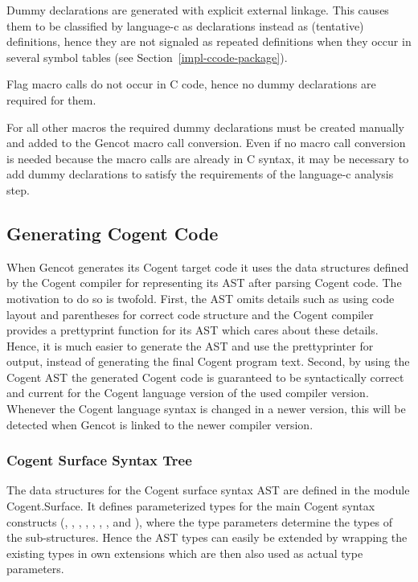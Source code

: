 Dummy declarations are generated with explicit external linkage. This causes them to be classified by language-c as 
declarations instead as (tentative) definitions, hence they are not signaled as repeated definitions when they occur 
in several symbol tables (see Section~\ref{impl-ccode-package}).

Flag macro calls do not occur in C code, hence no dummy declarations are required for them.

For all other macros the required dummy declarations must be created manually and added to the Gencot macro call conversion.
Even if no macro call conversion is needed because the macro calls are already in C syntax, it may be necessary to
add dummy declarations to satisfy the requirements of the language-c analysis step.

\subsection{Generating Cogent Code}
\label{impl-ccode-gencog}

When Gencot generates its Cogent target code it uses the data structures defined by the Cogent compiler for representing
its AST after parsing Cogent code. The motivation to do so is twofold. First, the AST omits details such as using code layout
and parentheses for correct code structure and the Cogent compiler provides a prettyprint function for its AST which cares
about these details. Hence, it is much easier to generate the AST and use the prettyprinter for output, instead of generating
the final Cogent program text. Second, by using the Cogent AST the generated Cogent code is guaranteed to be syntactically correct and
current for the Cogent language version of the used compiler version. Whenever the Cogent language syntax is changed
in a newer version, this will be detected when Gencot is linked to the newer compiler version.

\subsubsection{Cogent Surface Syntax Tree}

The data structures for the Cogent surface syntax AST are defined in the module Cogent.Surface. It defines parameterized types
for the main Cogent syntax constructs (, , , , , 
, , and ), where the type parameters determine the types of the 
sub-structures. Hence the AST types
can easily be extended by wrapping the existing types in own extensions which are then also used as actual type parameters.

